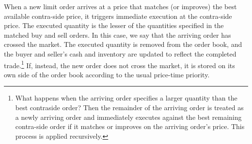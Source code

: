 \documentclass[12pt]{article}
\begin{document}
When a new limit order arrives at a price that matches (or improves) the best available contra-side price, it triggers immediate execution at the contra-side price. 
The executed quantity is the lesser of the quantities specified in the matched buy and sell orders. 
In this case, we say that the arriving order has crossed the market. 
The executed quantity is removed from the order book, and the buyer and seller's cash and inventory are updated to reflect the completed trade.\footnote{
What happens when the arriving order specifies a larger quantity than the best contraside order? 
Then the remainder of the arriving order is treated as a newly arriving order and immediately executes against the best remaining contra-side order if it matches or improves on the arriving order's price. This process is applied recursively.} 
If, instead, the new order does not cross the market, it is stored on its own side of the order book according to the usual price-time priority.




\end{document}
